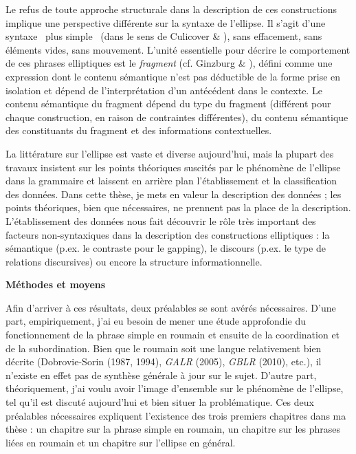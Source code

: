 Le refus de toute approche structurale dans la description de ces constructions implique une perspective différente sur la syntaxe de l'ellipse. Il s'agit d'une syntaxe {\guillemotleft}~plus simple~{\guillemotright} (dans le sens de Culicover \& \citet{Jackendoff2005}), sans effacement, sans éléments vides, sans mouvement. L'unité essentielle pour décrire le comportement de ces phrases elliptiques est le \textit{fragment} (cf. Ginzburg \& \citet{Sag2000}), défini comme une expression dont le contenu sémantique n'est pas déductible de la forme prise en isolation et dépend de l'interprétation d'un antécédent dans le contexte. Le contenu sémantique du fragment dépend du type du fragment (différent pour chaque construction, en raison de contraintes différentes), du contenu sémantique des constituants du fragment et des informations contextuelles. 

La littérature sur l'ellipse est vaste et diverse aujourd'hui, mais la plupart des travaux insistent sur les points théoriques suscités par le phénomène de l'ellipse dans la grammaire et laissent en arrière plan l'établissement et la classification des données. Dans cette thèse, je mets en valeur la description des données ; les points théoriques, bien que nécessaires, ne prennent pas la place de la description. L'établissement des données nous fait découvrir le rôle très important des facteurs non-syntaxiques dans la description des constructions elliptiques : la sémantique (p.ex. le contraste pour le gapping), le discours (p.ex. le type de relations discursives) ou encore la structure informationnelle.

{\bfseries
Méthodes et moyens}

Afin d'arriver à ces résultats, deux préalables se sont avérés nécessaires. D'une part, empiriquement, j'ai eu besoin de mener une étude approfondie du fonctionnement de la phrase simple en roumain et ensuite de la coordination et de la subordination. Bien que le roumain soit une langue relativement bien décrite (Dobrovie-Sorin (1987, 1994), \textit{GALR} (2005), \textit{GBLR} (2010), etc.), il n'existe en effet pas de synthèse générale à jour sur le sujet. D'autre part, théoriquement, j'ai voulu avoir l'image d'ensemble sur le phénomène de l'ellipse, tel qu'il est discuté aujourd'hui et bien situer la problématique. Ces deux préalables nécessaires expliquent l'existence des trois premiers chapitres dans ma thèse : un chapitre sur la phrase simple en roumain, un chapitre sur les phrases liées en roumain et un chapitre sur l'ellipse en général.

